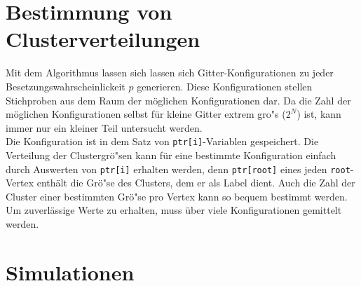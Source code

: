 \section{Bestimmung von Clusterverteilungen}
\label{sec:numerikverteilung}
Mit dem Algorithmus lassen sich lassen sich Gitter-Konfigurationen zu jeder Besetzungswahrscheinlickeit $p$ generieren. Diese Konfigurationen stellen Stichproben aus dem Raum der m\"oglichen Konfigurationen dar. Da die Zahl der m\"oglichen Konfigurationen selbst f\"ur kleine Gitter extrem gro"s ($2^{N}$) ist, kann immer nur ein kleiner Teil untersucht werden. \\
Die Konfiguration ist in dem Satz von \texttt{ptr[i]}-Variablen gespeichert. Die Verteilung der Clustergr\"o"sen kann f\"ur eine bestimmte Konfiguration einfach durch Auswerten von \texttt{ptr[i]} erhalten werden, denn \texttt{ptr[root]} eines jeden \texttt{root}-Vertex enth\"alt die Gr\"o"se des Clusters, dem er als Label dient. Auch die Zahl der Cluster einer bestimmten Gr\"o"se pro Vertex kann so bequem bestimmt werden. Um zuverl\"assige Werte zu erhalten, muss \"uber viele Konfigurationen gemittelt werden.

\section{Simulationen}

